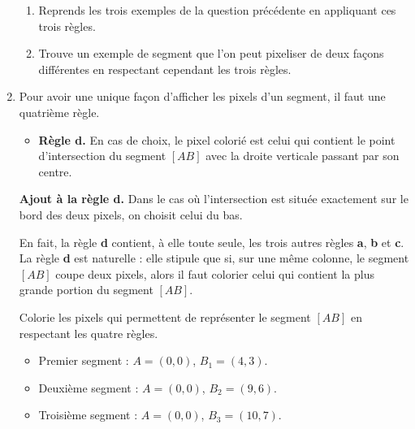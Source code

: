 \documentclass[class=report,crop=false, 12pt]{standalone}
\begin{document}
\begin{activite}
\begin{enumerate}
  
\begin{enumerate}
  \item Reprends les trois exemples de la question précédente en appliquant ces trois règles.

  

  \item Trouve un exemple de segment que l'on peut pixeliser de deux façons différentes en respectant cependant les trois règles.


   
  \end{enumerate}


  \item Pour avoir une unique façon d'afficher les pixels d'un segment, il faut une quatrième règle.
  
   \begin{itemize}
    \item \textbf{Règle d.} En cas de choix, le pixel colorié est celui qui contient le point d'intersection du segment $[AB]$ avec la droite verticale passant par son centre.
  \end{itemize}
 
\begin{minipage}{0.55\textwidth}   
\end{minipage}
\begin{minipage}{0.39\textwidth}   
\end{minipage}

\textbf{Ajout à la règle d.} Dans le cas où l'intersection est située exactement sur le bord des deux pixels, on choisit celui du bas.


En fait, la règle {\bf d} contient, à elle toute seule, les trois autres règles {\bf a}, {\bf b} et {\bf c}.
La règle {\bf d} est naturelle : elle stipule que si, sur une même colonne, le segment $[AB]$ coupe deux pixels, alors il faut colorier celui qui contient la plus grande portion du segment $[AB]$.

\medskip

Colorie les pixels qui permettent de représenter le segment $[AB]$ en respectant les quatre règles.
  \begin{itemize}
    \item Premier segment : $A=(0,0)$, $B_1=(4,3)$.
    \item Deuxième segment : $A=(0,0)$, $B_2=(9,6)$.    
    \item Troisième segment : $A=(0,0)$, $B_3=(10,7)$.   
  \end{itemize} 
  

\end{enumerate}
\end{activite}
\end{document}
